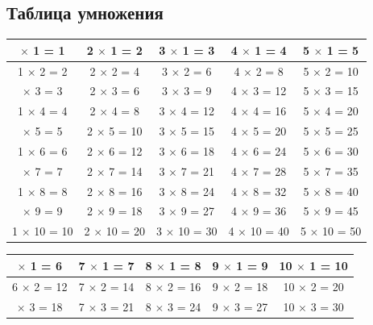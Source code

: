 \documentclass[a4paper, 14pt]{extarticle}
\begin{document}
{\subsection{Таблица умножения}
{\small
\begin{center}
{
\setlength{\extrarowheight}{2pt}
\begin{tabular}{|c|c|c|c|c|}
\hline 
\rowcolor{Gray}
\hline 
1 $\times$ 1 = 1 & 2 $\times$ 1 = 2 & 3 $\times$ 1 = 3 &4 $\times$ 1 = 4 &5 $\times$ 1 = 5\\ 
\hline 
1 $\times$ 2 = 2 & 2 $\times$ 2 = 4 & 3 $\times$ 2 = 6 &4 $\times$ 2 = 8 &5 $\times$ 2 = 10\\ 
\rowcolor{Gray}
\hline 
1 $\times$ 3 = 3 & 2 $\times$ 3 = 6 & 3 $\times$ 3 = 9 &4 $\times$ 3 = 12 &5 $\times$ 3 = 15\\ 
\hline 
1 $\times$ 4 = 4 & 2 $\times$ 4 = 8 &3 $\times$ 4 = 12 &4 $\times$ 4 = 16 &5 $\times$ 4 = 20\\ 
\rowcolor{Gray}
\hline 
1 $\times$ 5 = 5 & 2 $\times$ 5 = 10 & 3 $\times$ 5 = 15 &4 $\times$ 5 = 20 &5 $\times$ 5 = 25\\
\hline 
1 $\times$ 6 = 6 & 2 $\times$ 6 = 12 &3 $\times$ 6 = 18 &4 $\times$ 6 = 24 &5 $\times$ 6 = 30\\ 
\rowcolor{Gray}
\hline 
1 $\times$ 7 = 7 & 2 $\times$ 7 = 14 &3 $\times$ 7 = 21 &4 $\times$ 7 = 28 &5 $\times$ 7 = 35\\
\hline 
1 $\times$ 8 = 8 & 2 $\times$ 8 = 16 &3 $\times$ 8 = 24 &4 $\times$ 8 = 32 &5 $\times$ 8 = 40\\ 
\rowcolor{Gray}
\hline 
1 $\times$ 9 = 9 &2 $\times$ 9 = 18 &3 $\times$ 9 = 27 &4 $\times$ 9 = 36 &5 $\times$ 9 = 45\\
\hline 
1 $\times$ 10 = 10 &2 $\times$ 10 = 20 &3 $\times$ 10 = 30 &4 $\times$ 10 = 40 &5 $\times$ 10 = 50\\ 
\hline 
\end{tabular} 
}
\end{center}
\begin{center}
{
\setlength{\extrarowheight}{2pt}
\begin{tabular}{|c|c|c|c|c|}
\hline 
\rowcolor{Gray}
\hline 
6 $\times$ 1 = 6 & 7 $\times$ 1 = 7 & 8 $\times$ 1 = 8 &9 $\times$ 1 = 9 &10 $\times$ 1 = 10\\ 
\hline 
6 $\times$ 2 = 12 & 7 $\times$ 2 = 14 & 8 $\times$ 2 = 16 &9 $\times$ 2 = 18 &10 $\times$ 2 = 20\\ 
\rowcolor{Gray}
\hline 
6 $\times$ 3 = 18 & 7 $\times$ 3 = 21 & 8 $\times$ 3 = 24 &9 $\times$ 3 = 27 &10 $\times$ 3 = 30\\ 

\end{tabular}}
\end{center}}}
\end{document}
